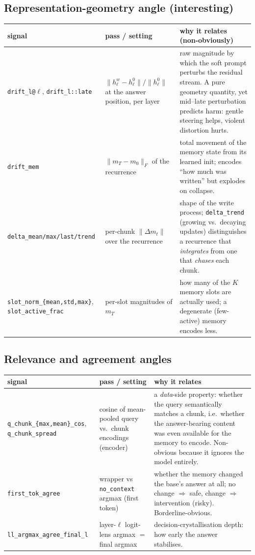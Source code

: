\documentclass[11pt]{article}
\newcommand{\noctx}{\texttt{no\_context}}
\newcommand{\code}[1]{\texttt{#1}}
\begin{document}
\subsection{Representation-geometry angle (interesting)}
\begin{center}\footnotesize\begin{tabular}{p{3.0cm} p{3.9cm} p{6.0cm}}
\toprule signal & pass / setting & why it relates (non-obviously)\\ \midrule
\code{drift\_l@$\ell$}, \code{drift\_l::late} & $\lVert h_\ell^{w}{-}h_\ell^{0}\rVert/\lVert h_\ell^{0}\rVert$ at the answer position, per layer & raw magnitude by which the soft prompt perturbs the residual stream. A pure geometry quantity, yet mid--late perturbation predicts harm: gentle steering helps, violent distortion hurts.\\
\code{drift\_mem} & $\lVert m_T{-}m_0\rVert_F$ of the recurrence & total movement of the memory state from its learned init; encodes ``how much was written'' but explodes on collapse.\\
\code{delta\_mean/max/last/trend} & per-chunk $\lVert\Delta m_t\rVert$ over the recurrence & shape of the write process; \code{delta\_trend} (growing vs.\ decaying updates) distinguishes a recurrence that \emph{integrates} from one that \emph{chases} each chunk.\\
\code{slot\_norm\_\{mean,std,max\}}, \code{slot\_active\_frac} & per-slot magnitudes of $m_T$ & how many of the $K$ memory slots are actually used; a degenerate (few-active) memory encodes less.\\
\bottomrule\end{tabular}\end{center}

\subsection{Relevance and agreement angles}
\begin{center}\footnotesize\begin{tabular}{p{3.0cm} p{3.9cm} p{6.0cm}}
\toprule signal & pass / setting & why it relates\\ \midrule
\code{q\_chunk\_\{max,mean\}\_cos}, \code{q\_chunk\_spread} & cosine of mean-pooled query vs.\ chunk encodings (encoder) & a \emph{data}-side property: whether the query semantically matches a chunk, i.e.\ whether the answer-bearing content was even available for the memory to encode. Non-obvious because it ignores the model entirely.\\
\code{first\_tok\_agree} & wrapper vs \noctx{} argmax (first token) & whether the memory changed the base's answer at all; no change $\Rightarrow$ safe, change $\Rightarrow$ intervention (risky). Borderline-obvious.\\
\code{ll\_argmax\_agree\_final\_l} & layer-$\ell$ logit-lens argmax $=$ final argmax & decision-crystallisation depth: how early the answer stabilises.\\
\bottomrule\end{tabular}\end{center}
\end{document}
